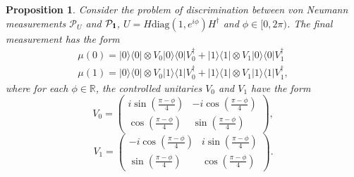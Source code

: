 \documentclass[preprint,12pt, a4paper]{elsarticle}
\newcommand{\ket}[1]{\ensuremath{|#1\rangle}}
\newcommand{\bra}[1]{\ensuremath{\langle#1|}}
\newcommand{\ketbra}[2]{\ensuremath{\ket{#1}\bra{#2}}}
\newcommand{\proj}[1]{\ensuremath{\ketbra{#1}{#1}}}
\newcommand{\1}{{\rm 1\hspace{-0.9mm}l}}
\newcommand{\PP}{\mathcal{P}}
\newcommand{\diag}{\mathrm{diag}}
\newtheorem{proposition}{Proposition}
\begin{document}
\begin{proposition}
	Consider the problem of discrimination between von Neumann measurements $\PP_U$ 
	and $\PP_\1$, $U = H\diag(1, e^{i \phi}) H^\dagger $ and $\phi \in [0, 
	2\pi)$.  
The  final measurement has the form
\begin{equation}
\begin{split}
\mu(0) = \proj{0} \otimes V_0 \proj{0} V_0^\dagger +  \proj{1} \otimes V_1 
\proj{0} V_1^\dagger  \\ 
\mu(1) = \proj{0} \otimes V_0 \proj{1} V_0^\dagger +  \proj{1} \otimes V_1 
\proj{1} V_1^\dagger,
\end{split}
\end{equation}
where for each $\phi \in \mathbb{R}$,  the controlled unitaries $V_0$ and $V_1$ 
have the form
\begin{equation}
V_0 = \left(\begin{array}{cc}i \sin\left( \frac{\pi - \phi}{4} \right)&-i 
\cos\left( \frac{\pi - \phi}{4} \right)\\ \cos\left( \frac{\pi - 
\phi}{4}\right)& \sin\left( \frac{\pi - \phi}{4} \right)\end{array}\right),
\end{equation}
\begin{equation}
V_1 = \left(\begin{array}{cc}-i \cos\left(\frac{\pi - \phi}{4}\right) &i 
\sin\left( \frac{\pi - \phi}{4}\right)\\\sin\left( \frac{\pi - \phi}{4} \right) 
&  \cos\left( \frac{\pi - \phi}{4} \right) \end{array}\right).
\end{equation}
\end{proposition}
\end{document}
